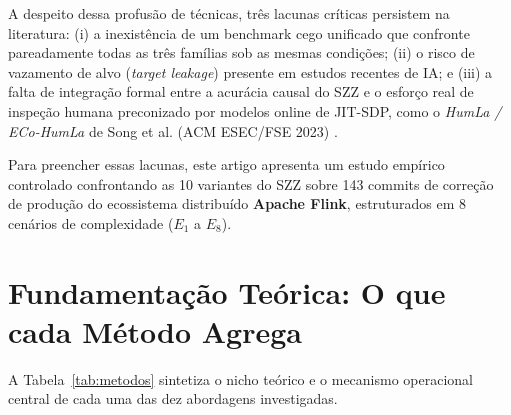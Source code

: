 \documentclass[10pt,journal,compsoc]{IEEEtran}
\begin{document}
A despeito dessa profusão de técnicas, três lacunas críticas persistem na literatura: (i) a inexistência de um benchmark cego unificado que confronte pareadamente todas as três famílias sob as mesmas condições; (ii) o risco de vazamento de alvo (\textit{target leakage}) presente em estudos recentes de IA; e (iii) a falta de integração formal entre a acurácia causal do SZZ e o esforço real de inspeção humana preconizado por modelos online de JIT-SDP, como o \textit{HumLa / ECo-HumLa} de Song et al. (ACM ESEC/FSE 2023) \cite{song2023practical}.

Para preencher essas lacunas, este artigo apresenta um estudo empírico controlado confrontando as 10 variantes do SZZ sobre 143 commits de correção de produção do ecossistema distribuído \textbf{Apache Flink}, estruturados em 8 cenários de complexidade ($E_1$ a $E_8$).

\section{Fundamentação Teórica: O que cada Método Agrega}
A Tabela~\ref{tab:metodos} sintetiza o nicho teórico e o mecanismo operacional central de cada uma das dez abordagens investigadas.
\end{document}
